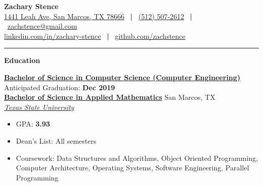 \documentclass[10pt]{article}
\newlength{\headingborderwidth}
\newcommand{\sep}{\ \textbf{|} \ }
\newcommand{\resheading}[1]{
    \begin{mdframed}[
        backgroundcolor=black!15,
        linewidth=\headingborderwidth,
        innertopmargin=4pt,
        innerbottommargin=4pt,
        skipabove=6pt,
        skipbelow=2pt]
        \textbf{\large #1}
    \end{mdframed}
}
\newcommand{\dressubheading}[5]{
    \textbf{#1} \hfill #2 \\[0pt]
    \textbf{#3} \hfill #4 \\[0pt]
    \textit{#5} \\[0pt]
}
\newcommand{\ressubheading}[4]{
    \textbf{#1} \hfill #2 \\[0pt]
    \textit{#3} \hfill #4 \\[0pt]
}
\newenvironment{resitemize}{
    \vspace{-6pt}
    \begin{itemize}
    \setlength\itemsep{-2pt}
}{
    \end{itemize}
}
\begin{document}
\begin{NoHyper}

%
%

\textbf{\huge Zachary Stence} \\[2pt]
\href{https://goo.gl/maps/5kUt8MF8fhMqY8UM9}{1441 Leah Ave, San Marcos, TX 78666} \sep    \href{tel:15125072612}{(512) 507-2612} \sep \href{mailto:zachstence@gmail.com}{zachstence@gmail.com} \\
\href{https://www.linkedin.com/in/zachary-stence}{linkedin.com/in/zachary-stence} \sep  \href{https://www.github.com/zachstence}{github.com/zachstence} \\[6pt]

\hrule
\vspace{2pt}

%
%

\resheading{Education}

\dressubheading
	{\href{http://mycatalog.txstate.edu/undergraduate/science-engineering/computer/computer-science-concentration-engineering-bs/}{Bachelor of Science in Computer Science (Computer Engineering)}}
	{Anticipated Graduation: \textbf{Dec 2019}}
	{\href{http://mycatalog.txstate.edu/undergraduate/science-engineering/mathematics/applied-bs/}{Bachelor of Science in Applied Mathematics}}
    {San Marcos, TX}
    {\href{http://www.txstate.edu/}{Texas State University}}
    	\begin{resitemize}
    		\item GPA: \textbf{3.93}
    		\item Dean's List: All semesters
    		\item Coursework: Data Structures and Algorithms, Object Oriented Programming, Computer Architecture, Operating Systems, Software Engineering, Parallel Programming
    	\end{resitemize}





\end{NoHyper}
\end{document}
